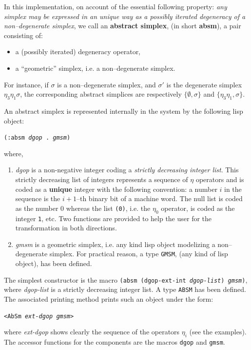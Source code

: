 In this implementation, 
on account of the essential following property: {\em any simplex
may be expressed in an unique way as a possibly iterated degeneracy of a non--degenerate
simplex}, we call an {\bf abstract simplex}, (in short {\bf absm}), a pair consisting of:
\begin{itemize}
\item a (possibly iterated) degeneracy operator,
\item a ``geometric'' simplex, i.e. a non--degenerate simplex.
\end{itemize}
For instance, if $\sigma$ is a non--degenerate simplex, and $\sigma'$ is the degenerate simplex 
$\eta_3\eta_1\sigma$, the corresponding abstract simplices are respectively 
$\lbrace \emptyset, \sigma \rbrace$ and $\lbrace \eta_3\eta_1, \sigma \rbrace$.
\par
An abstract simplex is represented internally in the system by the following lisp object:
\begin{center}
{\tt (:absm {\em dgop} . {\em gmsm})}
\end{center}
where,
\begin{enumerate}
\item {\em dgop} is a non-negative integer coding 
a {\em strictly decreasing integer list}. 
This strictly  decreasing list of integers represents a sequence
of $\eta$ o\-pe\-ra\-tors and is coded as a {\bf unique} integer with the following convention: a number $i$ in
the sequence is the $i+1$--th binary bit of a machine word. The null list is coded as the number $0$ whereas
the list {\tt (0)}, i.e. the $\eta_0$ operator, is coded as the integer {\tt 1}, etc.
Two functions are provided to help the user for the transformation in both directions.
\item {\em gmsm} is a geometric simplex,  i.e. any kind lisp object   modelizing a non--degenerate 
simplex. For practical reason, a  type {\tt GMSM}, (any kind of lisp object), has been defined.
\end{enumerate}
The simplest constructor is the macro  {\tt (absm (dgop-ext-int {\em dgop-list}) {\em gmsm})}, 
where {\em dgop-list} is a strictly decreasing integer list. A type {\tt ABSM} has been defined.
The associated printing method prints such an object under the form:
\begin{center}
{\tt <AbSm {\em ext-dgop gmsm}>}
\end{center}
where {\em ext-dgop} shows clearly the sequence of the operators $\eta_i$ (see the e\-xam\-ples).
The accessor functions for the components are the macros {\tt dgop} and {\tt gmsm}.
\newpage

